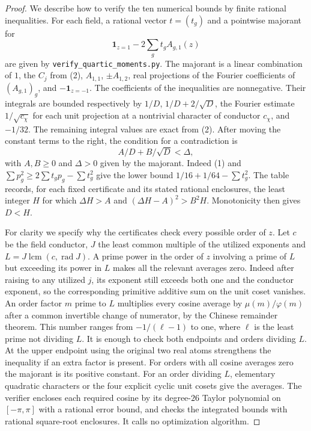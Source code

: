 \documentclass[11pt,a4paper]{article}
\numberwithin{equation}{section}
\begin{document}
\begin{proof}
We describe how to verify the ten numerical bounds by finite rational
inequalities.
For each field, a rational vector $t=(t_g)$ and a pointwise
majorant for
\[
 \mathbf1_{z=1}-2\sum_g t_g A_{g,1}(z)
\]
are given by \texttt{verify\_quartic\_moments.py}. The majorant is a
linear combination of $1$, the $C_j$ from (2), $A_{1,1}$,
$\pm A_{1,2}$, real projections of the Fourier coefficients of
$(A_{g,1})_g$, and $-\mathbf1_{z=-1}$.
The coefficients of the inequalities are nonnegative. Their integrals
are bounded respectively by $1/D$, $1/D+2/\sqrt D$, the Fourier
estimate $1/\sqrt{c_\chi}$ for each unit projection at a nontrivial
character of conductor $c_\chi$, and $-1/32$. The remaining integral
values are exact from (2). After moving the constant terms to the right, the condition for a contradiction is
\[
 A/D+B/\sqrt D<\Delta,
\]
with $A,B\ge0$ and $\Delta>0$ given by the majorant. Indeed (1) and $\sum p_g^2\ge2\sum t_gp_g-\sum t_g^2$ give the lower bound $1/16+1/64-\sum t_g^2$. The table records, for each fixed certificate and its stated rational enclosures, the least integer $H$ for which $\Delta H>A$ and $(\Delta H-A)^2>B^2H$. Monotonicity then gives $D<H$.

For clarity we specify why the certificates check every possible
order of $z$. Let $c$ be the field conductor, $J$ the least common
multiple of the utilized exponents and
$L=J\operatorname{lcm}(c,\operatorname{rad}J)$.
A prime power in the order of $z$ involving a prime of $L$ but exceeding
its power in $L$ makes all the relevant averages zero. Indeed after
raising to any utilized $j$, its exponent still exceeds both one and
the conductor exponent, so the corresponding primitive additive sum
on the unit coset vanishes. An order factor $m$ prime to $L$
multiplies every cosine average by $\mu(m)/\varphi(m)$ after a common
invertible change of numerator, by the Chinese remainder theorem.
This number ranges from $-1/(\ell-1)$ to one, where $\ell$ is the
least prime not dividing $L$. It is enough to check both endpoints
and orders dividing $L$. At the upper endpoint using the original
two real atoms strengthens the inequality if an extra factor is present.
For orders with all cosine averages zero the majorant is its positive
constant. For an order dividing $L$, elementary quadratic characters
or the four explicit cyclic unit cosets give the averages. The verifier
encloses each required cosine by its degree-$26$ Taylor polynomial on
$[-\pi,\pi]$ with a rational error bound, and checks the integrated
bounds with rational square-root enclosures. It calls no optimization
algorithm.
\end{proof}
\end{document}
